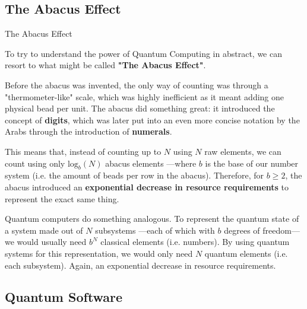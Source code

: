 \documentclass[9pt, handout, aspectratio=169]{beamer}		%
\begin{document}
	
	\subsection{The Abacus Effect}
	
	\begin{frame}{The Abacus Effect}
		
		To try to understand the power of Quantum Computing in abstract, we can resort to what might be called \textbf{"The Abacus Effect"}.
		
		\medskip
		
		Before the abacus was invented, the only way of counting was through a "thermometer-like" scale, which was highly inefficient as it meant adding one physical bead per unit. The abacus did something great: it introduced the concept of \textbf{digits}, which was later put into an even more concise notation by the Arabs through the introduction of \textbf{numerals}.
		
		\medskip
		
		This means that, instead of counting up to $N$ using $N$ raw elements, we can count using only $\text{log}_b (N)$ abacus elements ---where $b$ is the base of our number system (i.e. the amount of beads per row in the abacus). Therefore, for $b\geq2$, the abacus introduced an \textbf{exponential decrease in resource requirements} to represent the exact same thing.
		
		\medskip
		
		Quantum computers do something analogous. To represent the quantum state of a system made out of $N$ subsystems ---each of which with $b$ degrees of freedom--- we would usually need $b^N$ classical elements (i.e. numbers). By using quantum systems for this representation, we would only need $N$ quantum elements (i.e. each subsystem). Again, an exponential decrease in resource requirements.
		
	\end{frame}
	

	\subsection{Quantum Software}
		
\end{document}
